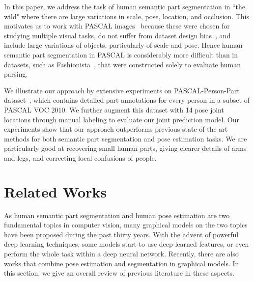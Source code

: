In this paper, we address the task of human semantic part segmentation in ``the wild" where there are large variations in scale, pose, location, and occlusion. This motivates us to work with PASCAL images~\cite{everingham2014pascal} because these were chosen for studying multiple visual tasks, do not suffer from dataset design bias~\cite{li2014secrets}, and include large variations of objects, particularly of scale and pose. Hence human semantic part segmentation in PASCAL is considerably more difficult than in datasets, such as Fashionista~\cite{yamaguchi2012parsing}, that were constructed solely to evaluate human parsing. 

We illustrate our approach by extensive experiments on PASCAL-Person-Part dataset~\cite{chen2014detect}, which contains detailed part annotations for every person in a subset of PASCAL VOC 2010. We further augment this dataset with 14 pose joint locations through manual labeling to evaluate our joint prediction model. Our experiments show that our approach outperforms previous state-of-the-art methods for both semantic part segmentation and pose estimation tasks. We are particularly good at recovering small human parts, giving clearer details of arms and legs, and correcting local confusions of people.

\section{Related Works}
As human semantic part segmentation and human pose estimation are two fundamental topics in computer vision, many graphical models on the two topics have been proposed during the past thirty years. With the advent of powerful deep learning techniques, some models start to use deep-learned features, or even perform the whole task within a deep neural network. Recently, there are also works that combine pose estimation and segmentation in graphical models. In this section, we give an overall review of previous literature in these aspects.

